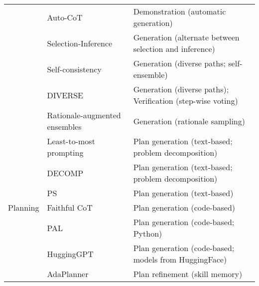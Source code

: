 \begin{table*}[t]
{\begin{tabular}{l|l|l}
                                                                                            & Auto-CoT~\cite{Zhang-arxiv-2022-Automatic}                        & Demonstration (automatic generation)                             \\
                                                                                            & Selection-Inference~\cite{Creswell-2022-arXiv-selection}          & Generation (alternate between selection and inference)                      \\
                                                                                            & Self-consistency~\cite{Wang-arxiv-2022-Self-Consistency}          & Generation (diverse paths; self-ensemble)             \\
                                                                                            & DIVERSE~\cite{Li-arxiv-2022-On}                                   & Generation (diverse paths); Verification (step-wise voting)           \\
                                                                                            & Rationale-augmented ensembles~\cite{Wang-arxiv-2022-Rationale}    & Generation (rationale sampling) \\
\midrule
\multirow{13}{*}{Planning}            & Least-to-most prompting~\cite{Zhou-arxiv-2022-Least} & Plan generation (text-based; problem decomposition)                                                  \\
                                     & DECOMP~\cite{Khot-2022-arXiv-Decomposed}             & Plan generation (text-based; problem decomposition) \\
                                     & PS~\cite{Wang-arXiv-2023-Plan}                       & Plan generation (text-based) \\
                                     & Faithful CoT~\cite{Lyu-arxiv-2023-Faithful}          & Plan generation (code-based) \\
                                     & PAL~\cite{Gao-arxiv-2022-PAL}                        & Plan generation (code-based; Python) \\
                                     & HuggingGPT~\cite{Shen-2023-arXiv-Hugginggpt}         & Plan generation (code-based; models from HuggingFace) \\
                                     & AdaPlanner~\cite{Sun-2023-arXiv-adaplanner}          & Plan refinement (skill memory) \\

\end{tabular}}
\end{table*}
